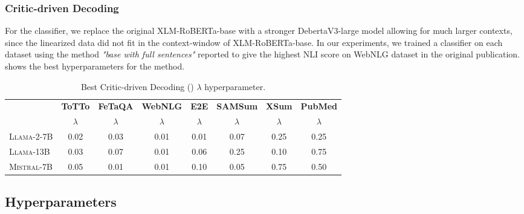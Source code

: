 \subsubsection{Critic-driven Decoding}
For the classifier, we replace the original XLM-RoBERTa-base \citep{xlm-roberta} with a stronger DebertaV3-large \citep{deberta} model allowing for much larger contexts, since the linearized data did not fit in the context-window of XLM-RoBERTa-base. In our experiments, we trained a classifier on each dataset using the method \textit{"base with full sentences"} reported to give the highest NLI score on WebNLG dataset in the original publication.
 shows the best hyperparameters for the method.

\begin{table}[h!]
\centering
\begin{tabular}{lccccccc}
    & \textbf{ToTTo} & \textbf{FeTaQA} & \textbf{WebNLG} & \textbf{E2E} & \textbf{SAMSum} & \textbf{XSum} & \textbf{PubMed} \\
    & $\lambda$ & $\lambda$ & $\lambda$ & $\lambda$ & $\lambda$ & $\lambda$ & $\lambda$ \\
    \midrule
    \textsc{Llama-2-7B} & 0.02 & 0.03 & 0.01 & 0.01 & 0.07 & 0.25 & 0.25 \\
    \textsc{Llama-13B}   & 0.03 & 0.07 & 0.01 & 0.06 & 0.25 & 0.10 & 0.75 \\
    \textsc{Mistral-7B}  & 0.05 & 0.01 & 0.01 & 0.10 & 0.05 & 0.75 & 0.50 \\
    \midrule
\end{tabular}

\caption{Best Critic-driven Decoding (\critic) $\lambda$ hyperparameter.}
\label{tab:critic-hyperparameter}
\end{table}

\subsection{Hyperparameters}

